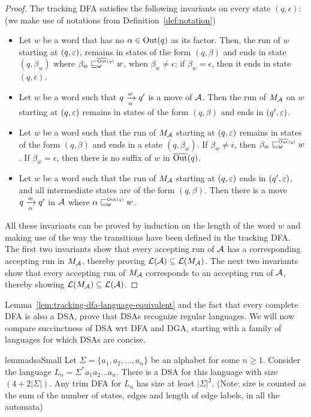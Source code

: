 \begin{proof}
  The tracking DFA satisfies the following invariants on every state
  $(q, \epsilon)$: (we make use of notations from
  Definition~\ref{def:notation}) 
  \begin{itemize}
  \item Let $w$ be a word that has no $\alpha \in \operatorname{Out}(q)$ as its
    factor. Then, the run of $w$ starting at $(q, \varepsilon)$, remains in
    states of the form $(q, \beta)$ and ends in state $(q, \beta_w)$
    where $\beta_w \sqsubseteq_{\scriptscriptstyle \mathsf{lsf}}^{\scriptscriptstyle \overline{\operatorname{Out}}(q)} w$, when $\beta_w \neq \epsilon$; if $\beta_w = \epsilon$, then it ends in state $(q, \overline{\epsilon})$. 
  \item Let $w$ be a word such that $q \xrightarrow[\alpha]{w} q'$ is a move of
    $\mathcal{A}$. Then the run of $M_{\mathcal{A}}$ on $w$ starting at $(q, \varepsilon)$
    remains in states of the form $(q, \beta)$ and ends in $(q', \varepsilon)$.
  \item Let $w$ be a word such that the run of $M_{\mathcal{A}}$ starting at
    $(q, \varepsilon)$ remains in states of the form $(q, \beta)$ and ends in a
    state $(q, \beta_w)$. If $\beta_w \neq \overline{\epsilon}$, then $\beta_w \sqsubseteq_{\scriptscriptstyle \mathsf{lsf}}^{\scriptscriptstyle \overline{\operatorname{Out}}(q)} w$. If $\beta_w = \epsilon$, then there is no suffix of $w$ in $\overline{\operatorname{Out}}(q)$. 
  \item Let $w$ be a word such that the run of $M_{\mathcal{A}}$ starting at
    $(q, \varepsilon)$ ends in $(q', \varepsilon)$, and all intermediate states are of
    the form $(q, \beta)$. Then there is a move $q \xrightarrow[\alpha]{w} q'$ in
    $\mathcal{A}$ where $\alpha \sqsubseteq_{\scriptscriptstyle \mathsf{lsf}}^{\scriptscriptstyle \operatorname{Out}(q)} w$.
  \end{itemize}
  All these invariants can be proved by induction on the length of the
  word $w$ and making use of the way the transitions have been defined
  in the tracking DFA. The first two invariants show that every
  accepting run of $\mathcal{A}$ has a corresponding accepting run in $M_{\mathcal{A}}$,
  thereby proving $\mathcal{L}(\mathcal{A}) \subseteq \mathcal{L}(M_{\mathcal{A}})$. The next two invariants
  show that every accepting run of $M_{\mathcal{A}}$ corresponds to an accepting
  run of $\mathcal{A}$, thereby showing $\mathcal{L}(M_{\mathcal{A}}) \subseteq \mathcal{L}(\mathcal{A})$.
\end{proof}


Lemma~\ref{lem:tracking-dfa-language-equivalent} and the fact that
every complete DFA is also a DSA, prove that DSAs recognize regular
languages. We will now compare succinctness of DSA wrt DFA and DGA,
starting with a family of languages for which DSAs are concise.




\begin{restatable}{lemma}{dsaSmall}
  \label{lem:dsa-small}
  Let $\Sigma = \{a_1, a_2, \dots, a_n\}$ be an alphabet for some $n \ge 1$. Consider
  the language $L_n = \Sigma^* a_1 a_2 \dots a_n$. There is a DSA for
  this language with size $(4 + 2 |\Sigma|)$.  Any trim DFA for $L_n$ has size at
  least ${|\Sigma|}^2$. (Note: size is counted as the sum of the number of
  states, edges and length of edge labels, in all the automata) 
\end{restatable}

